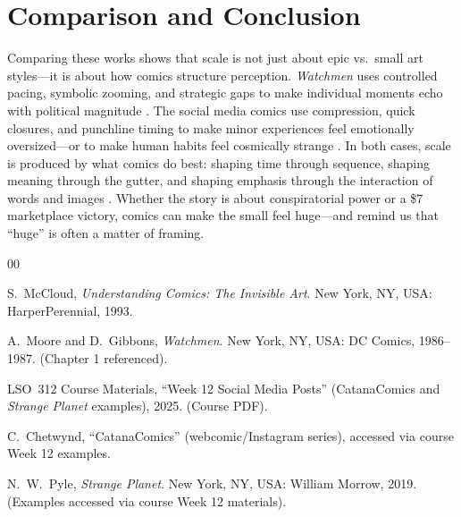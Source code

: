\documentclass[conference]{IEEEtran}
\begin{document}

\section{Comparison and Conclusion}
Comparing these works shows that scale is not just about epic vs.\ small art styles---it is about how comics structure perception. \textit{Watchmen} uses controlled pacing, symbolic zooming, and strategic gaps to make individual moments echo with political magnitude \cite{MooreGibbonsWatchmen}. The social media comics use compression, quick closures, and punchline timing to make minor experiences feel emotionally oversized---or to make human habits feel cosmically strange \cite{CourseWeek12,CatanaComics,Pyle2019}. In both cases, scale is produced by what comics do best: shaping time through sequence, shaping meaning through the gutter, and shaping emphasis through the interaction of words and images \cite{McCloud1993}. Whether the story is about conspiratorial power or a \$7 marketplace victory, comics can make the small feel huge---and remind us that ``huge'' is often a matter of framing.

\begin{thebibliography}{00}

S.~McCloud, \textit{Understanding Comics: The Invisible Art}. New York, NY, USA: HarperPerennial, 1993.

A.~Moore and D.~Gibbons, \textit{Watchmen}. New York, NY, USA: DC Comics, 1986--1987. (Chapter 1 referenced).

LSO~312 Course Materials, ``Week 12 Social Media Posts'' (CatanaComics and \textit{Strange Planet} examples), 2025. (Course PDF).

C.~Chetwynd, ``CatanaComics'' (webcomic/Instagram series), accessed via course Week 12 examples.

N.~W.~Pyle, \textit{Strange Planet}. New York, NY, USA: William Morrow, 2019. (Examples accessed via course Week 12 materials).

\end{thebibliography}
\end{document}
